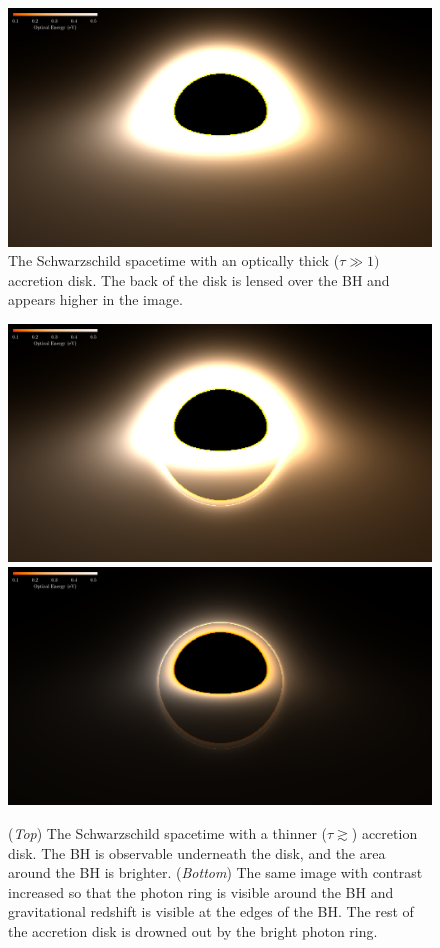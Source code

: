 \documentclass[twocolumn,twocolappendix]{aastex631}
\begin{document}
\begin{figure}[htbp!]
  \centering
  \includegraphics[width=\linewidth]{../data/thick-optical.pdf}
  \caption{The Schwarzschild spacetime with an optically thick ($\tau \gg 1)$ accretion disk. The back of the disk is lensed over the BH and appears higher in the image.}
  \label{fig:thick}
\end{figure}

\begin{figure}[htbp!]
  \centering
  \includegraphics[width=\linewidth]{../data/thin-optical.pdf}
  \includegraphics[width=\linewidth]{../data/thin-bright-optical.pdf}
  \caption{(\textit{Top}) The Schwarzschild spacetime with a thinner ($\tau \gtrsim$) accretion disk. The BH is observable underneath the disk, and the area around the BH is brighter. (\textit{Bottom}) The same image with contrast increased so that the photon ring is visible around the BH and gravitational redshift is visible at the edges of the BH. The rest of the accretion disk is drowned out by the bright photon ring.}
  \label{fig:thin}
\end{figure}
\end{document}
